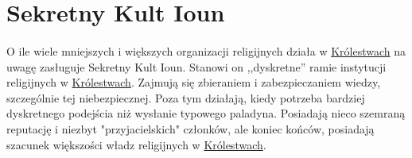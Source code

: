 \label{KultIoun}
\section{Sekretny Kult Ioun}
\paragraph{}
O ile wiele mniejszych i większych organizacji religijnych działa w \hyperref[SojuszniczeKrolestwa]{Królestwach} na uwagę zasługuje Sekretny Kult Ioun.
Stanowi on ,,dyskretne'' ramie instytucji religijnych w \hyperref[SojuszniczeKrolestwa]{Królestwach}.
Zajmują się zbieraniem i zabezpieczaniem wiedzy, szczególnie tej niebezpiecznej.
Poza tym działają, kiedy potrzeba bardziej dyskretnego podejścia niż wysłanie typowego paladyna.
Posiadają nieco szemraną reputację i niezbyt "przyjacielskich" członków, ale koniec końców, posiadają szacunek większości władz religijnych w \hyperref[SojuszniczeKrolestwa]{Królestwach}.
